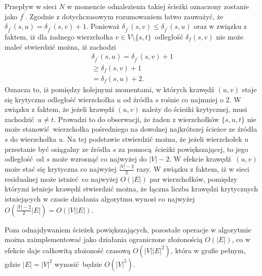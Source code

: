{\begin{bproof}
    Przepływ w sieci $N$ w momencie odnalezienia takiej ścieżki oznaczony zostanie jako $f^\prime$.
    Zgodnie z dotychczasowym rozumowaniem łatwo zauważyć, że $\delta_{f^\prime}(s, u)=\delta_{f^\prime}(s, v) + 1$.
    Ponieważ $\delta_{f^\prime}(s, v) \leq \delta_{f^\prime}(s, u)$ oraz w związku z faktem, iż dla żadnego wierzchołka $v \in V\setminus \{s, t\}$ odległość $\delta_f(s, v)$ nie może maleć stwierdzić można, iż zachodzi \begin{align*}
        \delta_{f^\prime}(s,u)=\delta_{f^\prime}(s,v)+1\\
                           \geq\delta_f(s, v)+1\\
                              =\delta_f(s, u)+2.
    \end{align*}
    Oznacza to, iż pomiędzy kolejnymi momentami, w których krawędź $(u, v)$ staje się krytyczna odległość wierzchołka $u$ od źródła $s$ rośnie co najmniej o 2.
    W związku z faktem, że jeżeli krawędź $(u, v)$ należy do ścieżki krytycznej, musi zachodzić $u \neq t$.
    Prowadzi to do obserwacji, że żaden z wierzchołków $\{s, u, t\}$ nie może stanowić wierzchołka pośredniego na dowolnej najkrótszej ścieżce ze źródła $s$ do wierzchołka $u$.
    Na tej podstawie stwierdzić można, że jeżeli wierzchołek $u$ przestanie być osiągalny ze źródła $s$ za pomocą ścieżki powiększającej, to jego odległość od $s$ może wzrosnąć co najwyżej do $|V|-2$.
    W efekcie krawędź $(u, v)$ może stać się krytyczna co najwyżej $\frac{|V|-2}{2}$ razy.
    W związku z faktem, iż w sieci residualnej może istnieć co najwyżej $O(|E|)$ par wierzchołków, pomiędzy którymi istnieje krawędź stwierdzić można, że łączna liczba krawędzi krytycznych istniejących w czasie działania algorytmu wynosi co najwyżej $O(\frac{|V|-2}{2}|E|)=O(|V||E|)$.
  \end{bproof}

  Poza odnajdywaniem ścieżek powiększających, pozostałe operacje w algorytmie można zaimplementować jako działania ograniczone złożonością $O(|E|)$, co w efekcie daje całkowitą złożoność czasową $O(|V||E|^2)$, która w grafie pełnym, gdzie $|E| = |V|^2$ wynosić będzie $O(|V|^5)$.
}